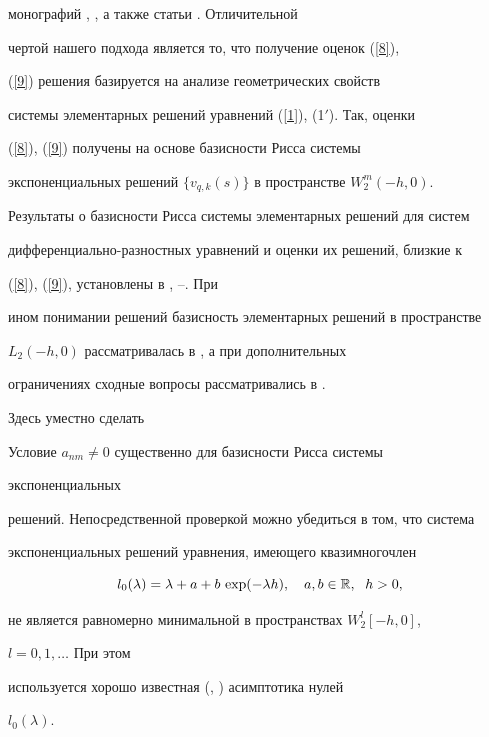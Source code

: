 монографий \cite{4}, \cite{6}, а также статьи \cite{5}. Отличительной 


чертой нашего подхода является то, что получение оценок (\ref{8}), 


(\ref{9}) решения базируется на анализе геометрических свойств 


системы элементарных решений уравнений (\ref{1}), (1$'$). Так, оценки 


(\ref{8}), (\ref{9}) получены на основе базисности Рисса системы 


экспоненциальных решений $\{v_{q,k}(s)\}$ в пространстве $W^m_2(-h,0)$. 


 


Результаты о базисности Рисса системы элементарных решений для систем 


дифференциально-разностных уравнений и оценки их решений, близкие к 


(\ref{8}), (\ref{9}), установлены в \cite{1}, \cite{15}--\cite{17}. При 


ином понимании решений базисность элементарных решений в пространстве 


$L_2(-h,0)$ рассматривалась в \cite{18}, а при дополнительных 


ограничениях сходные вопросы рассматривались в \cite{19}. 


 


Здесь уместно сделать 


 


\begin{note} 


Условие $a_{nm}\ne 0$ существенно для базисности Рисса системы 


экспоненциальных 


решений. Непосредственной проверкой можно убедиться в том, что система 


экспоненциальных решений уравнения, имеющего квазимногочлен 


$$ 


l_0(\lambda)=\lambda+a+b\,\exp(-\lambda h),\quad 


a,b\in\Bbb R,\ \; h>0, 


$$ 


не является равномерно минимальной в пространствах $W^l_2[-h,0]$, 


$l=0,1,\dotsc$ При этом 


используется хорошо известная (\cite{2}, \cite{4}) асимптотика нулей 


$l_0(\lambda)$. 


\end{note} 


